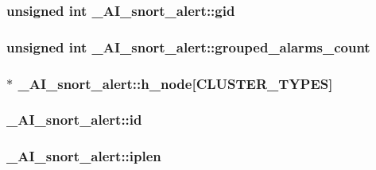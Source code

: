 \label{struct__AI__snort__alert_a6b323c07ae501d221e330e13646a96a3}
\hypertarget{struct__AI__snort__alert_af8408be5da59cda853442dd13465c0f6}{
\subsubsection[{gid}]{\setlength{\rightskip}{0pt plus 5cm}unsigned int {\bf \_\-AI\_\-snort\_\-alert::gid}}}
\label{struct__AI__snort__alert_af8408be5da59cda853442dd13465c0f6}
\hypertarget{struct__AI__snort__alert_a285aff12d6bac03c316ccc5305d28e53}{
\subsubsection[{grouped\_\-alarms\_\-count}]{\setlength{\rightskip}{0pt plus 5cm}unsigned int {\bf \_\-AI\_\-snort\_\-alert::grouped\_\-alarms\_\-count}}}
\label{struct__AI__snort__alert_a285aff12d6bac03c316ccc5305d28e53}
\hypertarget{struct__AI__snort__alert_ac53765584296ead1328eabfaba8a3aed}{
\subsubsection[{h\_\-node}]{$\ast$ {\bf \_\-AI\_\-snort\_\-alert::h\_\-node}\mbox{[}CLUSTER\_\-TYPES\mbox{]}}}
\label{struct__AI__snort__alert_ac53765584296ead1328eabfaba8a3aed}
\hypertarget{struct__AI__snort__alert_a45e4acf90450a5f9efd4e0c290f84bcf}{
\subsubsection[{id}]{ {\bf \_\-AI\_\-snort\_\-alert::id}}}
\label{struct__AI__snort__alert_a45e4acf90450a5f9efd4e0c290f84bcf}
\hypertarget{struct__AI__snort__alert_a523ef8842d01a1bc4ea3c0bf27518e78}{
\subsubsection[{iplen}]{ {\bf \_\-AI\_\-snort\_\-alert::iplen}}}
